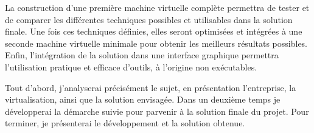

La construction d'une première machine virtuelle complète permettra de tester et de comparer les différentes techniques possibles et utilisables dans la solution finale.
Une fois ces techniques définies, elles seront optimisées et intégrées à une seconde machine virtuelle minimale pour obtenir les meilleurs résultats possibles.
Enfin, l'intégration de la solution dans une interface graphique permettra l'utilisation pratique et efficace d'outils, à l'origine non exécutables.



Tout d'abord, j'analyserai précisément le sujet, en présentation l'entreprise, la virtualisation, ainsi que la solution envisagée.
Dans un deuxième temps je développerai la démarche suivie pour parvenir à la solution finale du projet.
Pour terminer, je présenterai le développement et la solution obtenue.